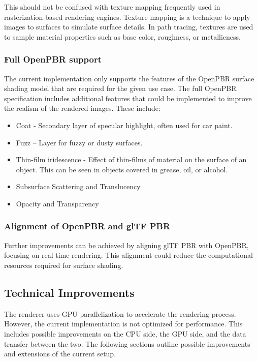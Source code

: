 This should not be confused with texture mapping frequently used in rasterization-based rendering engines. Texture mapping is a technique to apply images to surfaces to simulate surface details. In path tracing, textures are used to sample material properties such as base color, roughness, or metallicness.

\subsubsection*{Full OpenPBR support}

The current implementation only supports the features of the \gls{OpenPBR} surface shading model that are required for the given use case. The full \gls{OpenPBR} specification includes additional features that could be implemented to improve the realism of the rendered images. These include:

\begin{itemize}
  \item{Coat} - Secondary layer of specular highlight, often used for car paint.
  \item{Fuzz} – Layer for fuzzy or dusty surfaces.
  \item{Thin-film iridescence} - Effect of thin-films of material on the surface of an object. This can be seen in objects covered in grease, oil, or alcohol.
  \item{Subsurface Scattering and Translucency}
  \item{Opacity and Transparency}
\end{itemize}

\subsubsection*{Alignment of OpenPBR and glTF PBR}

Further improvements can be achieved by aligning \gls{glTF} \gls{PBR} with \gls{OpenPBR}, focusing on real-time rendering. This alignment could reduce the computational resources required for surface shading.

\subsection*{Technical Improvements}

The renderer uses \gls{GPU} parallelization to accelerate the rendering process. However, the current implementation is not optimized for performance. This includes possible improvements on the \gls{CPU} side, the \gls{GPU} side, and the data transfer between the two. The following sections outline possible improvements and extensions of the current setup.

